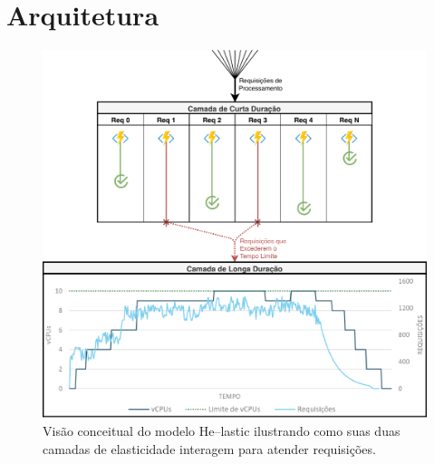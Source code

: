 \documentclass[english,brazilian]{UNISINOSmonografia} %
\newcommand\defaultFigureWidth{0.9}
\begin{document}
\section{Arquitetura}
\label{sec:modelo-arquitetura}


\begin{figure}[tb]
	\centering%
	\begin{minipage}{\defaultFigureWidth\textwidth}
		\caption{Visão conceitual do modelo \textsf{He}--lastic ilustrando como suas duas camadas de elasticidade interagem para atender requisições.}
		\label{fig:modelo-conceitual}
		\includegraphics[width=\textwidth]{modelo-conceitual}
	\end{minipage}
\end{figure}
\end{document}
